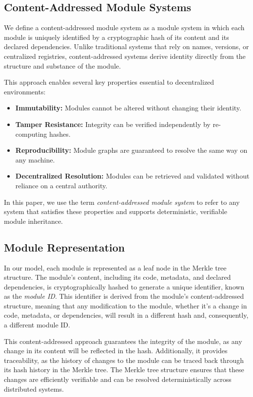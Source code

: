 \documentclass[sigplan,screen]{acmart}
\begin{document}
\subsection{Content-Addressed Module Systems}
\label{sec:content-addressed-module-systems}

We define a content-addressed module system as a module system in which each module is uniquely identified by a cryptographic hash of its content and its declared dependencies. Unlike traditional systems that rely on names, versions, or centralized registries, content-addressed systems derive identity directly from the structure and substance of the module.

This approach enables several key properties essential to decentralized environments:
\begin{itemize}
    \item \textbf{Immutability:} Modules cannot be altered without changing their identity.
    \item \textbf{Tamper Resistance:} Integrity can be verified independently by re-computing hashes.
    \item \textbf{Reproducibility:} Module graphs are guaranteed to resolve the same way on any machine.
    \item \textbf{Decentralized Resolution:} Modules can be retrieved and validated without reliance on a central authority.
\end{itemize}

In this paper, we use the term \textit{content-addressed module system} to refer to any system that satisfies these properties and supports deterministic, verifiable module inheritance.

\subsection{Module Representation}
In our model, each module is represented as a leaf node in the Merkle tree structure. The module's content, including its code, metadata, and declared dependencies, is cryptographically hashed to generate a unique identifier, known as the \emph{module ID}. This identifier is derived from the module's content-addressed structure, meaning that any modification to the module, whether it's a change in code, metadata, or dependencies, will result in a different hash and, consequently, a different module ID.

This content-addressed approach guarantees the integrity of the module, as any change in its content will be reflected in the hash. Additionally, it provides traceability, as the history of changes to the module can be traced back through its hash history in the Merkle tree. The Merkle tree structure ensures that these changes are efficiently verifiable and can be resolved deterministically across distributed systems.
\end{document}
